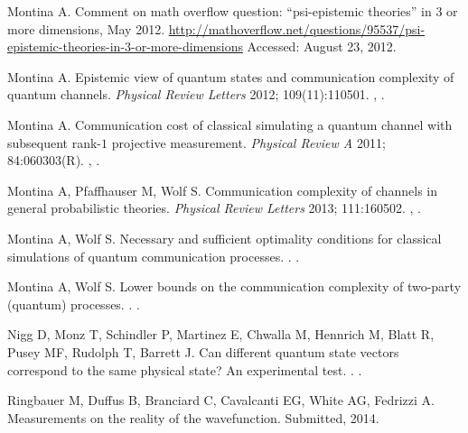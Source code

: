 \documentclass[DIV=calc,paper=a4,fontsize=11pt,twocolumn]{scrartcl} %
\theoremstyle{definition}
\theoremstyle{plain}
\begin{document}
\begin{thebibliography}{10}
Montina A.
\newblock Comment on math overflow question: ``psi-epistemic theories'' in 3 or more dimensions, May 2012.
\newblock
\url{http://mathoverflow.net/questions/95537/psi-epistemic-theories-in-3-or-more-dimensions}
Accessed: August 23, 2012.

Montina A.
\newblock Epistemic view of quantum states and communication complexity of quantum channels.
\newblock \emph{Physical Review Letters} 2012; 109(11):110501.
\newblock \href {http://arxiv.org/abs/1206.2961} {},
\href {http://dx.doi.org/10.1103/PhysRevLett.109.110501}
{}.

Montina A.
\newblock Communication cost of classical simulating a quantum channel with
subsequent rank-$1$ projective measurement.
\newblock \emph{Physical Review A} 2011; 84:060303(R).
\newblock \href {http://arxiv.org/abs/1110.5944} {},
\href {http://dx.doi.org/10.1103/PhysRevA.84.060303}
{}.

Montina A, Pfaffhauser M, Wolf S.
\newblock Communication complexity of channels in general probabilistic
theories.
\newblock \emph{Physical Review Letters} 2013; 111:160502.
\newblock \href {http://arxiv.org/abs/1301.4441} {},
\href {http://dx.doi.org/10.1103/PhysRevLett.111.160502}
{}.

Montina A, Wolf S.
\newblock Necessary and sufficient optimality conditions for classical simulations of quantum communication processes.
.
\newblock \href {http://arxiv.org/abs/1402.6299} {}.

Montina A, Wolf S.
\newblock Lower bounds on the communication complexity of two-party (quantum)
processes.
.
\newblock \href {http://arxiv.org/abs/1401.4126} {}.

Nigg D, Monz T, Schindler P, Martinez E, Chwalla M, Hennrich M, Blatt R, Pusey MF, Rudolph T, Barrett J.
\newblock Can different quantum state vectors correspond to the same physical state? An experimental test.
.
\newblock \href {http://arxiv.org/abs/1211.0942} {}.

Ringbauer M, Duffus B, Branciard C, Cavalcanti EG, White AG, Fedrizzi A.
\newblock Measurements on the reality of the wavefunction.
\newblock Submitted, 2014.


\end{thebibliography}
\end{document}
